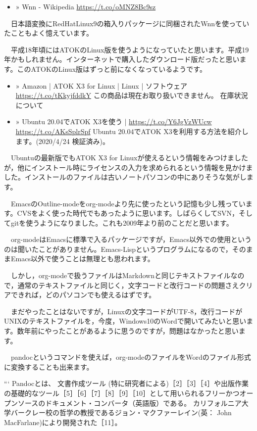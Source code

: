 \documentclass[]{ltjarticle}
\begin{document}
\begin{itemize}
\item » Wnn - Wikipedia \url{https://t.co/oMNZ8Bc9sz}
\end{itemize}

　日本語変換にRedHatLinux9の箱入りパッケージに同梱されたWnnを使っていたこともよく憶えています。

　平成18年頃にはATOKのLinux版を使うようになっていたと思います。平成19年かもしれません。インターネットで購入したダウンロード版だったと思います。このATOKのLinux版はずっと前になくなっているようです。

\begin{itemize}
\item » Amazon | ATOK X3 for Linux | Linux | ソフトウェア \url{https://t.co/tKkyjfddkY} この商品は現在お取り扱いできません。 在庫状況について

\item » Ubuntu 20.04でATOK X3を使う | \url{https://t.co/Y6JgVzWUcw} \url{https://t.co/AKsSplrSpf} Ubuntu 20.04でATOK X3を利用する方法を紹介します。(2020/4/24 検証済み)。
\end{itemize}

　Ubuntuの最新版でもATOK X3 for Linuxが使えるという情報をみつけましたが，他にインストール時にライセンスの入力を求められるという情報を見かけました。インストールのファイルは古いノートパソコンの中にありそうな気がします。

　EmacsのOutline-modeをorg-modeより先に使ったという記憶も少し残っています。CVSをよく使った時代でもあったように思います。しばらくしてSVN，そしてgitを使うようになりました。これも2009年より前のことだと思います。

　org-modeはEmacsに標準で入るパッケージですが，Emacs以外での使用というのは聞いたことがありません。Emacs-Lispというプログラムになるので，そのままEmacs以外で使うことは無理とも思われます。

　しかし，org-modeで扱うファイルはMarkdownと同じテキストファイルなので，通常のテキストファイルと同じく，文字コードと改行コードの問題さえクリアできれば，どのパソコンでも使えるはずです。

　まだやったことはないですが，Linuxの文字コードがUTF-8，改行コードがUNIXのテキストファイルを，今度，Windows10のWordで開いてみたいと思います。数年前にやったことがあるように思うのですが，問題はなかったと思います。

　pandocというコマンドを使えば，org-modeのファイルをWordのファイル形式に変換することも出来ます。

```
Pandocとは、 文書作成ツール (特に研究者による)［2］［3］［4］や出版作業の基礎的なツール［5］［6］［7］［8］［9］［10］として用いられるフリーかつオープンソースのドキュメント・コンバータ（英語版）である。 カリフォルニア大学バークレー校の哲学の教授であるジョン・マクファーレイン(英： John MacFarlane)により開発された［11］。
\end{document}
